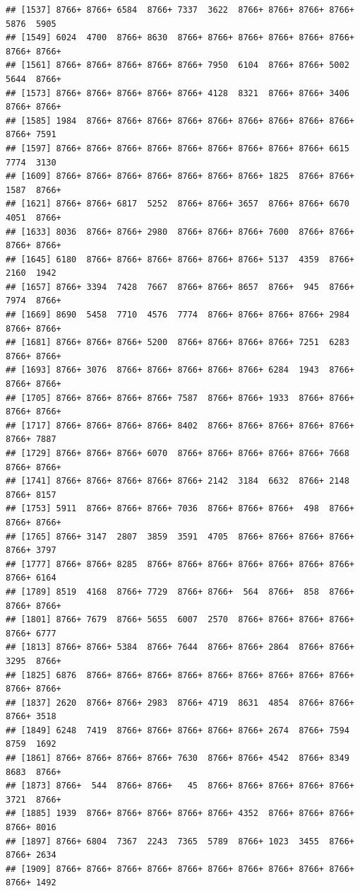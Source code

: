 \documentclass[
]{book}
\begin{document}
\begin{verbatim}
## [1537] 8766+ 8766+ 6584  8766+ 7337  3622  8766+ 8766+ 8766+ 8766+ 5876  5905 
## [1549] 6024  4700  8766+ 8630  8766+ 8766+ 8766+ 8766+ 8766+ 8766+ 8766+ 8766+
## [1561] 8766+ 8766+ 8766+ 8766+ 8766+ 7950  6104  8766+ 8766+ 5002  5644  8766+
## [1573] 8766+ 8766+ 8766+ 8766+ 8766+ 4128  8321  8766+ 8766+ 3406  8766+ 8766+
## [1585] 1984  8766+ 8766+ 8766+ 8766+ 8766+ 8766+ 8766+ 8766+ 8766+ 8766+ 7591 
## [1597] 8766+ 8766+ 8766+ 8766+ 8766+ 8766+ 8766+ 8766+ 8766+ 6615  7774  3130 
## [1609] 8766+ 8766+ 8766+ 8766+ 8766+ 8766+ 8766+ 1825  8766+ 8766+ 1587  8766+
## [1621] 8766+ 8766+ 6817  5252  8766+ 8766+ 3657  8766+ 8766+ 6670  4051  8766+
## [1633] 8036  8766+ 8766+ 2980  8766+ 8766+ 8766+ 7600  8766+ 8766+ 8766+ 8766+
## [1645] 6180  8766+ 8766+ 8766+ 8766+ 8766+ 8766+ 5137  4359  8766+ 2160  1942 
## [1657] 8766+ 3394  7428  7667  8766+ 8766+ 8657  8766+  945  8766+ 7974  8766+
## [1669] 8690  5458  7710  4576  7774  8766+ 8766+ 8766+ 8766+ 2984  8766+ 8766+
## [1681] 8766+ 8766+ 8766+ 5200  8766+ 8766+ 8766+ 8766+ 7251  6283  8766+ 8766+
## [1693] 8766+ 3076  8766+ 8766+ 8766+ 8766+ 8766+ 6284  1943  8766+ 8766+ 8766+
## [1705] 8766+ 8766+ 8766+ 8766+ 7587  8766+ 8766+ 1933  8766+ 8766+ 8766+ 8766+
## [1717] 8766+ 8766+ 8766+ 8766+ 8402  8766+ 8766+ 8766+ 8766+ 8766+ 8766+ 7887 
## [1729] 8766+ 8766+ 8766+ 6070  8766+ 8766+ 8766+ 8766+ 8766+ 7668  8766+ 8766+
## [1741] 8766+ 8766+ 8766+ 8766+ 8766+ 2142  3184  6632  8766+ 2148  8766+ 8157 
## [1753] 5911  8766+ 8766+ 8766+ 7036  8766+ 8766+ 8766+  498  8766+ 8766+ 8766+
## [1765] 8766+ 3147  2807  3859  3591  4705  8766+ 8766+ 8766+ 8766+ 8766+ 3797 
## [1777] 8766+ 8766+ 8285  8766+ 8766+ 8766+ 8766+ 8766+ 8766+ 8766+ 8766+ 6164 
## [1789] 8519  4168  8766+ 7729  8766+ 8766+  564  8766+  858  8766+ 8766+ 8766+
## [1801] 8766+ 7679  8766+ 5655  6007  2570  8766+ 8766+ 8766+ 8766+ 8766+ 6777 
## [1813] 8766+ 8766+ 5384  8766+ 7644  8766+ 8766+ 2864  8766+ 8766+ 3295  8766+
## [1825] 6876  8766+ 8766+ 8766+ 8766+ 8766+ 8766+ 8766+ 8766+ 8766+ 8766+ 8766+
## [1837] 2620  8766+ 8766+ 2983  8766+ 4719  8631  4854  8766+ 8766+ 8766+ 3518 
## [1849] 6248  7419  8766+ 8766+ 8766+ 8766+ 8766+ 2674  8766+ 7594  8759  1692 
## [1861] 8766+ 8766+ 8766+ 8766+ 7630  8766+ 8766+ 4542  8766+ 8349  8683  8766+
## [1873] 8766+  544  8766+ 8766+   45  8766+ 8766+ 8766+ 8766+ 8766+ 3721  8766+
## [1885] 1939  8766+ 8766+ 8766+ 8766+ 8766+ 4352  8766+ 8766+ 8766+ 8766+ 8016 
## [1897] 8766+ 6804  7367  2243  7365  5789  8766+ 1023  3455  8766+ 8766+ 2634 
## [1909] 8766+ 8766+ 8766+ 8766+ 8766+ 8766+ 8766+ 8766+ 8766+ 8766+ 8766+ 1492 

\end{verbatim}
\end{document}
